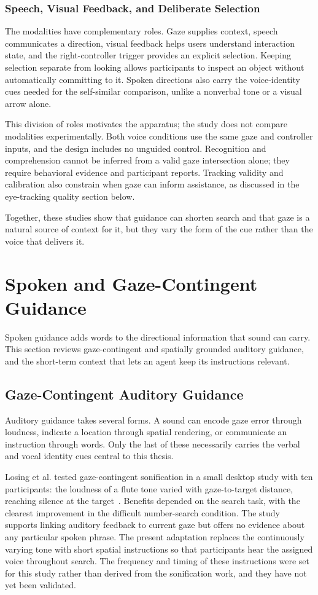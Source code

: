 \subsubsection{Speech, Visual Feedback, and Deliberate Selection}
The modalities have complementary roles. Gaze supplies context, speech communicates a direction, visual feedback helps users understand interaction state, and the right-controller trigger provides an explicit selection. Keeping selection separate from looking allows participants to inspect an object without automatically committing to it. Spoken directions also carry the voice-identity cues needed for the self-similar comparison, unlike a nonverbal tone or a visual arrow alone.

This division of roles motivates the apparatus; the study does not compare modalities experimentally. Both voice conditions use the same gaze and controller inputs, and the design includes no unguided control. Recognition and comprehension cannot be inferred from a valid gaze intersection alone; they require behavioral evidence and participant reports. Tracking validity and calibration also constrain when gaze can inform assistance, as discussed in the eye-tracking quality section below.

Together, these studies show that guidance can shorten search and that gaze is a natural source of context for it, but they vary the form of the cue rather than the voice that delivers it.

\section{Spoken and Gaze-Contingent Guidance}
Spoken guidance adds words to the directional information that sound can carry. This section reviews gaze-contingent and spatially grounded auditory guidance, and the short-term context that lets an agent keep its instructions relevant.

\subsection{Gaze-Contingent Auditory Guidance}
Auditory guidance takes several forms. A sound can encode gaze error through loudness, indicate a location through spatial rendering, or communicate an instruction through words. Only the last of these necessarily carries the verbal and vocal identity cues central to this thesis.

Losing et al. tested gaze-contingent sonification in a small desktop study with ten participants: the loudness of a flute tone varied with gaze-to-target distance, reaching silence at the target~\cite{losing2014guiding}. Benefits depended on the search task, with the clearest improvement in the difficult number-search condition. The study supports linking auditory feedback to current gaze but offers no evidence about any particular spoken phrase. The present adaptation replaces the continuously varying tone with short spatial instructions so that participants hear the assigned voice throughout search. The frequency and timing of these instructions were set for this study rather than derived from the sonification work, and they have not yet been validated.

